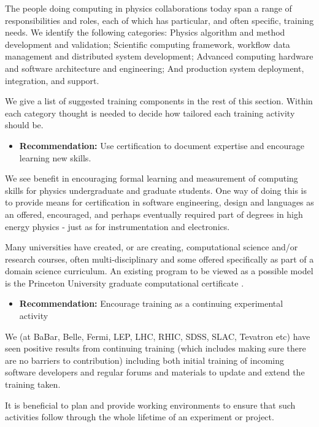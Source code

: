 The people doing computing in physics collaborations today span a
range of responsibilities and roles, each of which has particular,
and often specific, training needs.  We identify the following
categories:  Physics algorithm and method development and validation;
Scientific computing framework, workflow data management and
distributed system development; Advanced computing hardware and
software architecture and engineering; And production system
deployment, integration, and support.

We give a list of suggested training components in the rest of this
section.  Within each category thought is needed to decide how
tailored each training activity should be.

\begin{itemize}
\item[] {\bf Recommendation:} Use certification to document expertise and encourage learning new skills.
\end{itemize}

We see benefit in encouraging formal learning and measurement of
computing skills for physics undergraduate and graduate students.
One way of doing this is to provide means for certification in
software engineering, design and languages as an offered, encouraged,
and perhaps eventually required part of degrees in high energy
physics - just as for instrumentation and electronics.
 
Many universities have created, or are creating, computational
science and/or research courses, often multi-disciplinary and some
offered specifically as part of a domain science curriculum.
An existing program to be viewed as a possible model is the Princeton
University graduate computational certificate \cite{PUGRAD}.

\begin{itemize}
\item[] {\bf Recommendation:}  Encourage training as a continuing experimental activity
\end{itemize}

We (at BaBar, Belle, Fermi, LEP, LHC, RHIC, SDSS, SLAC, Tevatron
etc) have seen positive results from continuing training (which
includes making sure there are no barriers to contribution) including
both initial training of incoming software developers and regular
forums and materials to update and extend the training taken.

It is beneficial to plan and provide working environments to ensure
that such activities follow through the whole lifetime of an
experiment or project.

